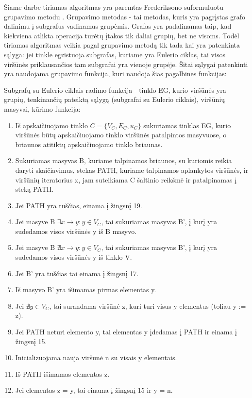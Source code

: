 Šiame darbe tiriamas algoritmas yra paremtas Frederiksono suformuluotu grupavimo metodu \cite{DSfUoMST}. Grupavimo metodas - tai metodas, kuris yra pagrįstas grafo dalinimu į subgrafus vadinamus grupėmis. Grafas yra padalinamas taip, kad kiekviena atlikta operacija turėtų įtakos tik daliai grupių, bet ne visoms. Todėl tiriamas algoritmas veikia pagal grupavimo metodą tik tada kai yra patenkinta sąlyga: jei tinkle egzistuoja subgrafas, kuriame yra Eulerio ciklas, tai visos viršūnės priklausančios tam subgrafui yra vienoje grupėje. Šitai sąlygai patenkinti yra naudojama grupavimo funkcija, kuri naudoja šias pagalbines funkcijas:

Subgrafų su Eulerio ciklais radimo funkcija - tinklo EG, kurio viršūnės yra grupių, tenkinančių pateiktą sąlygą (subgrafai su Eulerio ciklais), viršūnių masyvai, kūrimo funkcija:
\begin{enumerate}
	\item Iš apskaičiuojamo tinklo $C=\{V_C, E_C, u_C\}$ sukuriamas tinklas EG, kurio viršūnės būtų apskaičiuojamo tinklo viršūnės patalpintos masyvuose, o briaunos atitiktų apskaičiuojamo tinklo briaunas.
	\item Sukuriamas masyvas B, kuriame talpinamos briaunos, su kuriomis reikia daryti skaičiavimus, stekas PATH, kuriame talpinamos aplankytos viršūnės, ir viršūnių iteratorius x, jam suteikiama C šaltinio reikšmė ir patalpinamas į steką PATH.
	\item Jei PATH yra tuščias, einama į žingsnį 19.
	\item Jei masyve B $\exists x \rightarrow y : y \in V_C$, tai sukuriamas masyvas B', į kurį yra sudedamos visos viršūnės y iš B masyvo.
	\item Jei masyve B $\nexists x \rightarrow y : y \in V_C$, tai sukuriamas masyvas B', į kurį yra sudedamos visos viršūnės y iš tinklo V.
	\item Jei B' yra tuščias tai einama į žingsnį 17.
	\item Iš masyvo B' yra išimamas pirmas elementas y.
	\item Jei $\nexists y \in V_C$, tai surandama viršūnė z, kuri turi visus y elementus (toliau y := z).
	\item Jei PATH neturi elemento y, tai elementas y įdedamas į PATH ir einama į žingsnį 15.
	\item Inicializuojama nauja viršūnė n su visais y elementais.
	\item Iš PATH išimamas elementas z.
	\item Jei elementas z = y, tai einama į žingsnį 15 ir y = n.

\end{enumerate}
